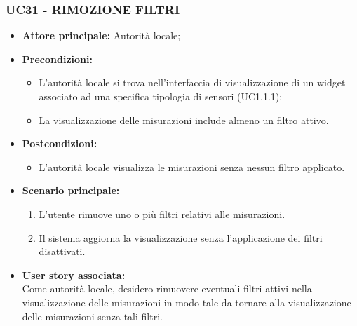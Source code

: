 \subsubsection{UC31 - RIMOZIONE FILTRI}
\begin{itemize}
    \item \textbf{Attore principale:} Autorità locale;
    \item \textbf{Precondizioni:}
        \begin{itemize}
        \item L'autorità locale si trova nell'interfaccia di visualizzazione di un widget associato ad una specifica tipologia di sensori (UC1.1.1);
        \item La visualizzazione delle misurazioni include almeno un filtro attivo.
        \end{itemize}
    \item \textbf{Postcondizioni:}
        \begin{itemize}
            \item L'autorità locale visualizza le misurazioni senza nessun filtro applicato.
        \end{itemize}
    \item \textbf{Scenario principale:}
        \begin{enumerate}
            \item L'utente rimuove uno o più filtri relativi alle misurazioni.
            \item Il sistema aggiorna la visualizzazione senza l'applicazione dei filtri disattivati.
        \end{enumerate}
    \item \textbf{User story associata:} \\
        Come autorità locale, desidero rimuovere eventuali filtri attivi nella visualizzazione delle misurazioni in modo tale da tornare alla visualizzazione delle misurazioni senza tali filtri.
\end{itemize}
